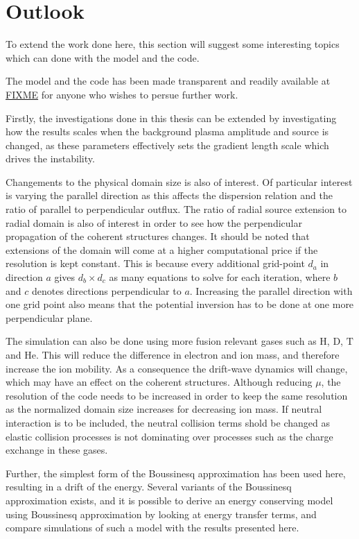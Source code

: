 \section*{Outlook}
%
To extend the work done here, this section will suggest some interesting topics which can done with the model and the code.

The model and the code has been made transparent and readily available at \href{FIXME}{FIXME} for anyone who wishes to persue further work.

Firstly, the investigations done in this thesis can be extended by investigating how the results scales when the background plasma amplitude and source is changed, as these parameters effectively sets the gradient length scale which drives the instability.

Changements to the physical domain size is also of interest.
Of particular interest is varying the parallel direction as this affects the dispersion relation and the ratio of parallel to perpendicular outflux.
The ratio of radial source extension to radial domain is also of interest in order to see how the perpendicular propagation of the coherent structures changes.
It should be noted that extensions of the domain will come at a higher computational price if the resolution is kept constant.
This is because every additional grid-point $d_a$ in direction $a$ gives $d_b\times d_c$ as many equations to solve for each iteration, where $b$ and $c$ denotes directions perpendicular to $a$.
Increasing the parallel direction with one grid point also means that the potential inversion has to be done at one more perpendicular plane.

The simulation can also be done using more fusion relevant gases such as $\text{H}$, $\text{D}$, $\text{T}$ and $\text{He}$.
This will reduce the difference in electron and ion mass, and therefore increase the ion mobility.
As a consequence the drift-wave dynamics will change, which may have an effect on the coherent structures.
Although reducing $\mu$, the resolution of the code needs to be increased in order to keep the same resolution as the normalized domain size increases for decreasing ion mass.
If neutral interaction is to be included, the neutral collision terms shold be changed as elastic collision processes is not dominating over processes such as the charge exchange in these gases.

Further, the simplest form of the Boussinesq approximation has been used here, resulting in a drift of the energy.
Several variants of the Boussinesq approximation exists, and it is possible to derive an energy conserving model using Boussinesq approximation by looking at energy transfer terms, and compare simulations of such a model with the results presented here.

